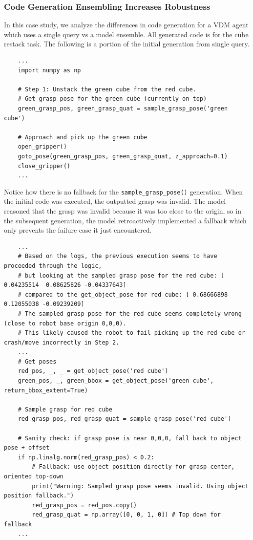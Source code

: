 \subsubsection{Code Generation Ensembling Increases Robustness}
\label{app:model_ensemble_case_study_robust}
In this case study, we analyze the differences in code generation for a VDM agent which uses a single query vs a model ensemble. All generated code is for the cube restack task. The following is a portion of the initial generation from single query.
\begin{lstlisting}
    ...
    import numpy as np
    
    # Step 1: Unstack the green cube from the red cube.
    # Get grasp pose for the green cube (currently on top)
    green_grasp_pos, green_grasp_quat = sample_grasp_pose('green cube')
    
    # Approach and pick up the green cube
    open_gripper()
    goto_pose(green_grasp_pos, green_grasp_quat, z_approach=0.1)
    close_gripper()
    ...
\end{lstlisting}
Notice how there is no fallback for the \texttt{sample\_grasp\_pose()} generation. When the initial code was executed, the outputted grasp was invalid. The model reasoned that the grasp was invalid because it was too close to the origin, so in the subsequent generation, the model retroactively implemented a fallback which only prevents the failure case it just encountered.

\begin{lstlisting}
    ...
    # Based on the logs, the previous execution seems to have proceeded through the logic,
    # but looking at the sampled grasp pose for the red cube: [ 0.04235514  0.08625826 -0.04337643]
    # compared to the get_object_pose for red cube: [ 0.68666898  0.12055038 -0.09239209]
    # The sampled grasp pose for the red cube seems completely wrong (close to robot base origin 0,0,0).
    # This likely caused the robot to fail picking up the red cube or crash/move incorrectly in Step 2.
    ...
    # Get poses
    red_pos, _, _ = get_object_pose('red cube')
    green_pos, _, green_bbox = get_object_pose('green cube', return_bbox_extent=True)
    
    # Sample grasp for red cube
    red_grasp_pos, red_grasp_quat = sample_grasp_pose('red cube')
    
    # Sanity check: if grasp pose is near 0,0,0, fall back to object pose + offset
    if np.linalg.norm(red_grasp_pos) < 0.2:
        # Fallback: use object position directly for grasp center, oriented top-down
        print("Warning: Sampled grasp pose seems invalid. Using object position fallback.")
        red_grasp_pos = red_pos.copy()
        red_grasp_quat = np.array([0, 0, 1, 0]) # Top down for fallback
    ...
\end{lstlisting}

